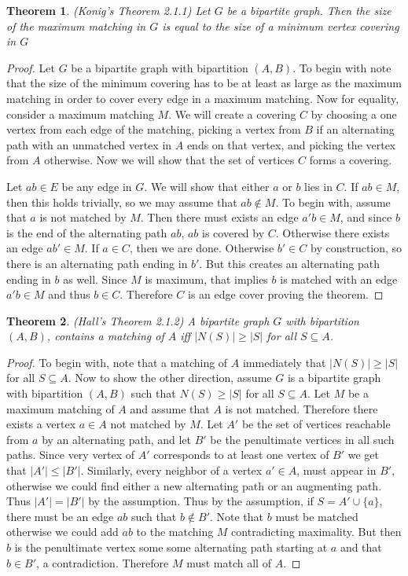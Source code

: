 \documentclass[12pt]{article}
\newtheorem{theorem}{Theorem}
\begin{document}
\begin{theorem} (Konig's Theorem 2.1.1) Let $G$ be a bipartite
  graph. Then the size of the maximum matching in $G$ is equal to the
  size of a minimum vertex covering in $G$
\end{theorem}
\begin{proof} Let $G$ be a bipartite graph with bipartition
  $(A,B)$. To begin with note that the size of the minimum covering
  has to be at least as large as the maximum matching in order to
  cover every edge in a maximum matching. Now for equality, consider a
  maximum matching $M$. We will create a covering $C$ by choosing a
  one vertex from each edge of the matching, picking a vertex from $B$
  if an alternating path with an unmatched vertex in $A$ ends on that
  vertex, and picking the vertex from $A$ otherwise. Now we will show
  that the set of vertices $C$ forms a covering.

  Let $ab \in E$ be any edge in $G$. We will show that either $a$ or
  $b$ lies in $C$. If $ab \in M$, then this holds trivially, so we may
  assume that $ab \notin M$. To begin with, assume that $a$ is not
  matched by $M$. Then there must exists an edge $a'b \in M$, and
  since $b$ is the end of the alternating path $ab$, $ab$ is covered
  by $C$. Otherwise there exists an edge $ab' \in M$. If $a \in C$,
  then we are done. Otherwise $b' \in C$ by construction, so there is
  an alternating path ending in $b'$. But this creates an alternating
  path ending in $b$ as well. Since $M$ is maximum, that implies $b$
  is matched with an edge $a'b \in M$ and thus $b \in C$. Therefore
  $C$ is an edge cover proving the theorem.
\end{proof}

\begin{theorem} (Hall's Theorem 2.1.2) A bipartite graph $G$ with
  bipartition $(A,B)$, contains a matching of $A$ iff
  $|N(S)| \geq |S|$ for all $S \subseteq A$.
\end{theorem}
\begin{proof} To begin with, note that a matching of $A$ immediately
  that $|N(S)| \geq |S|$ for all $S \subseteq A$. Now to show the
  other direction, assume $G$ is a bipartite graph with bipartition
  $(A,B)$ such that $N(S) \geq |S| $ for all $S \subseteq A$. Let $M$
  be a maximum matching of $A$ and assume that $A$ is not
  matched. Therefore there exists a vertex $a \in A$ not matched by
  $M$. Let $A'$ be the set of vertices reachable from $a$ by an
  alternating path, and let $B'$ be the penultimate vertices in all
  such paths. Since very vertex of $A'$ corresponds to at least one
  vertex of $B'$ we get that $|A'| \leq |B'|$. Similarly, every
  neighbor of a vertex $a' \in A$, must appear in $B'$, otherwise we
  could find either a new alternating path or an augmenting path. Thus
  $|A'| = |B'|$ by the assumption.  Thus by the assumption, if
  $S = A' \cup \{ a\}$, there must be an edge $ab$ such that
  $b \notin B'$. Note that $b$ must be matched otherwise we could add
  $ab$ to the matching $M$ contradicting maximality. But then $b$ is
  the penultimate vertex some some alternating path starting at $a$
  and that $b \in B'$, a contradiction. Therefore $M$ must match all
  of $A$.
\end{proof}
\end{document}
